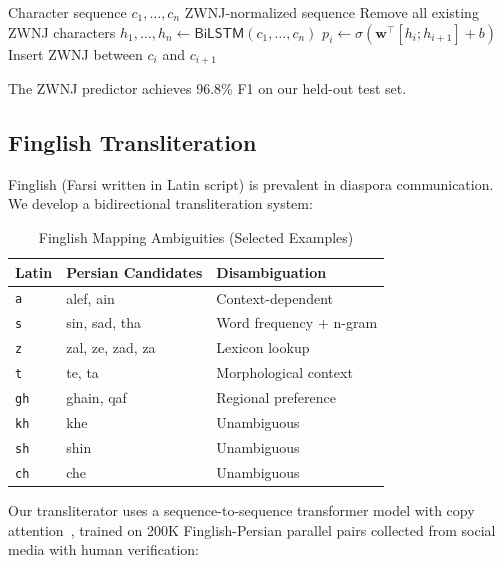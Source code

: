 \documentclass[11pt,a4paper]{article}
\begin{document}
\begin{algorithm}[H]
\caption{ZWNJ Prediction}
\label{alg:zwnj}
\begin{algorithmic}[1]
\Require Character sequence $c_1, \ldots, c_n$
\Ensure ZWNJ-normalized sequence
\State Remove all existing ZWNJ characters
\State $h_1, \ldots, h_n \leftarrow \mathsf{BiLSTM}(c_1, \ldots, c_n)$
    \State $p_i \leftarrow \sigma(\mathbf{w}^\top [h_i; h_{i+1}] + b)$
     
        \State Insert ZWNJ between $c_i$ and $c_{i+1}$
    \EndIf
\EndFor
\end{algorithmic}
\end{algorithm}

The ZWNJ predictor achieves 96.8\% F1 on our held-out test set.

\subsection{Finglish Transliteration}

Finglish (Farsi written in Latin script) is prevalent in diaspora communication. We develop a bidirectional transliteration system:

\begin{table}[H]
\centering
\caption{Finglish Mapping Ambiguities (Selected Examples)}
\label{tab:finglish}
\begin{tabular}{lll}
\toprule
\textbf{Latin} & \textbf{Persian Candidates} & \textbf{Disambiguation} \\
\midrule
\texttt{a} & alef, ain & Context-dependent \\
\texttt{s} & sin, sad, tha & Word frequency + n-gram \\
\texttt{z} & zal, ze, zad, za & Lexicon lookup \\
\texttt{t} & te, ta & Morphological context \\
\texttt{gh} & ghain, qaf & Regional preference \\
\texttt{kh} & khe & Unambiguous \\
\texttt{sh} & shin & Unambiguous \\
\texttt{ch} & che & Unambiguous \\
\bottomrule
\end{tabular}
\end{table}

Our transliterator uses a sequence-to-sequence transformer model with copy attention~\citep{gu2016copying}, trained on 200K Finglish-Persian parallel pairs collected from social media with human verification:
\end{document}
